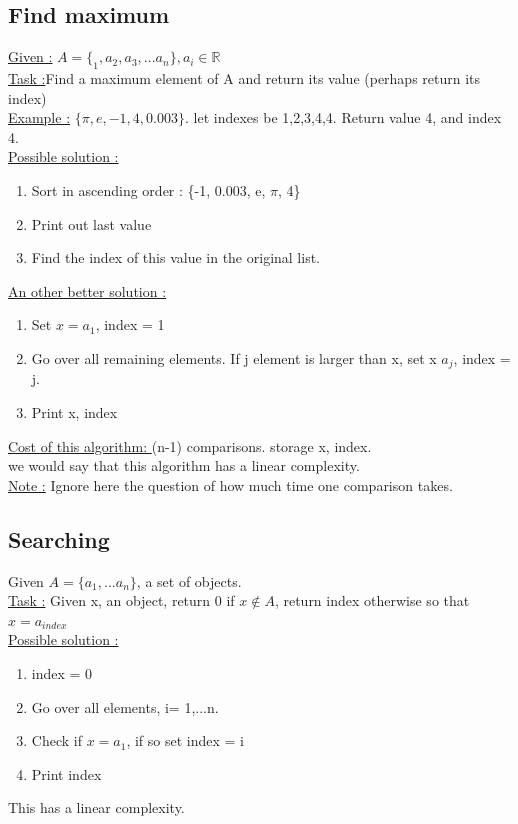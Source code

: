 \documentclass[12pt,a4paper]{article}
\begin{document}
\subsection{Find maximum}

\underline{Given :} $A = \{_1, a_2, a_3,... a_n\}, a_i \in \mathbb{R}$\\
\underline{Task :}Find a maximum element of A and return its value (perhaps return its index)\\
\underline{Example :} $\{\pi, e, -1, 4, 0.003\}$. let indexes be 1,2,3,4,4. Return value 4, and index 4.\\
\underline{Possible solution :}
\begin{enumerate}
\item Sort in ascending order : \{-1, 0.003, e, $\pi$, 4\}
\item Print out last value
\item Find the index of this value in the original list.
\end{enumerate}
\underline{An other better solution :}
\begin{enumerate}
\item Set $x = a_1$, index = 1
\item Go over all remaining elements. If j element is larger than x, set x  $a_j$, index = j.
\item Print x, index
\end{enumerate}
\underline{Cost of this algorithm: } (n-1) comparisons. storage x, index.\\
we would say that this algorithm has a linear complexity.\\
\underline{Note :} Ignore here the question of how much time one comparison takes.

\subsection{Searching}
Given $A= \{a_1,...a_n\}$, a set of objects.\\
\underline{Task :} Given x, an object, return 0 if $x \not \in A$, return index otherwise so that $x = a_{index}$\\
\underline{Possible solution :}
\begin{enumerate}
\item index = 0
\item Go over all elements, i= 1,...n. 
\item Check if $x = a_1$, if so set index = i
\item Print index
\end{enumerate}
This has a linear complexity.\\
\end{document}
